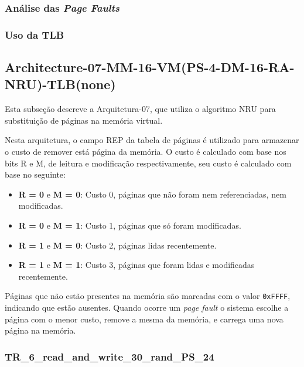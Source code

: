 \documentclass[
	12pt,				%
	oneside,   	        %
	a4paper,			%
	english,			%
	french,				%
	spanish,			%
	brazil,				%
	]{pacotes/abntex2}
\begin{document}
\subsubsection{Análise das \textit{Page Faults}}
\label{subsubsec:analise-arch6}

\subsubsection{Uso da TLB}
\label{subsubsec:tlb-arch6}

\subsection{Architecture-07-MM-16-VM(PS-4-DM-16-RA-NRU)-TLB(none)}
\label{subsec:architecture-07}

Esta subseção descreve a Arquitetura-07, que utiliza o algoritmo NRU para substituição de páginas na memória virtual.

Nesta arquitetura, o campo REP da tabela de páginas é utilizado para armazenar o custo de remover está página da memória. O custo é calculado com base nos bits R e M, de leitura e modificação respectivamente, seu custo é calculado com base no seguinte:
\begin{itemize}
    \item \textbf{R = 0} e \textbf{M = 0}: Custo 0, páginas que não foram nem referenciadas, nem modificadas.

    \item \textbf{R = 0} e \textbf{M = 1}: Custo 1, páginas que só foram modificadas.

    \item \textbf{R = 1} e \textbf{M = 0}: Custo 2, páginas lidas recentemente.

    \item \textbf{R = 1} e \textbf{M = 1}: Custo 3, páginas que foram lidas e modificadas recentemente.
\end{itemize}

Páginas que não estão presentes na memória são marcadas com o valor \texttt{0xFFFF}, indicando que estão ausentes. Quando ocorre um \textit{page fault} o sistema escolhe a página com o menor custo, remove a mesma da memória, e carrega uma nova página na memória.

\subsubsection{TR\_6\_read\_and\_write\_30\_rand\_PS\_24}
\label{subsubsec:tr6-arch7}
\end{document}
